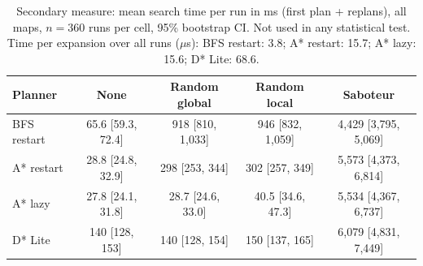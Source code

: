 \begin{table}[!t]
\centering
\footnotesize
\caption{Secondary measure: mean search time per run in ms (first plan + replans), all maps, $n=360$ runs per cell, 95\% bootstrap CI. Not used in any statistical test. Time per expansion over all runs ($\mu$s): BFS restart: 3.8; A* restart: 15.7; A* lazy: 15.6; D* Lite: 68.6.}
\label{tab:time}
\begin{tabular}{lcccc}
\toprule
Planner & None & Random global & Random local & Saboteur \\
\midrule
BFS restart & 65.6 [59.3, 72.4] & 918 [810, 1,033] & 946 [832, 1,059] & 4,429 [3,795, 5,069] \\
A* restart & 28.8 [24.8, 32.9] & 298 [253, 344] & 302 [257, 349] & 5,573 [4,373, 6,814] \\
A* lazy & 27.8 [24.1, 31.8] & 28.7 [24.6, 33.0] & 40.5 [34.6, 47.3] & 5,534 [4,367, 6,737] \\
D* Lite & 140 [128, 153] & 140 [128, 154] & 150 [137, 165] & 6,079 [4,831, 7,449] \\
\bottomrule
\end{tabular}
\end{table}
